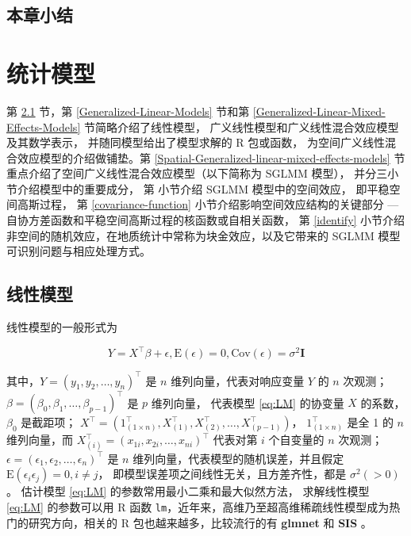 \documentclass[12pt,a4paper,UTF8,twoside]{book}
\theoremstyle{definition}
\theoremstyle{definition}
\theoremstyle{definition}
\theoremstyle{remark}
\begin{document}
\hypertarget{sec:foundations}{%
\section{本章小结}\label{sec:foundations}}

\hypertarget{models}{%
\chapter{统计模型}\label{models}}

第 \ref{Linear-Models} 节，第 \ref{Generalized-Linear-Models} 节和第
\ref{Generalized-Linear-Mixed-Effects-Models} 节简略介绍了线性模型，
广义线性模型和广义线性混合效应模型及其数学表示，
并随同模型给出了模型求解的 R 包或函数，
为空间广义线性混合效应模型的介绍做铺垫。第
\ref{Spatial-Generalized-linear-mixed-effects-models}
节重点介绍了空间广义线性混合效应模型（以下简称为 SGLMM 模型），
并分三小节介绍模型中的重要成分， 第 小节介绍 SGLMM 模型中的空间效应，
即平稳空间高斯过程， 第 \ref{covariance-function}
小节介绍影响空间效应结构的关键部分 ---
自协方差函数和平稳空间高斯过程的核函数或自相关函数， 第 \ref{identify}
小节介绍非空间的随机效应，在地质统计中常称为块金效应，以及它带来的 SGLMM
模型可识别问题与相应处理方式。

\hypertarget{Linear-Models}{%
\section{线性模型}\label{Linear-Models}}

线性模型的一般形式为

\begin{equation}
Y = X^{\top}\beta + \epsilon, \mathrm{E}(\epsilon) = 0, \mathrm{Cov}(\epsilon) = \sigma^2\mathbf{I}  \label{eq:LM}
\end{equation}

\noindent 其中，\(Y = (y_1,y_2,\ldots,y_n)^{\top}\) 是 \(n\)
维列向量，代表对响应变量 \(Y\) 的 \(n\) 次观测；
\(\beta = (\beta_0,\beta_1,\ldots,\beta_{p-1})^{\top}\) 是 \(p\)
维列向量， 代表模型 \eqref{eq:LM} 的协变量 \(X\) 的系数，\(\beta_0\)
是截距项；
\(X^{\top} = (1_{(1\times n)}^{\top},X_{(1)}^{\top},X_{(2)}^{\top},\ldots,X_{(p-1)}^{\top})\)，
\(1_{(1\times n)}^{\top}\) 是全 1 的 \(n\) 维列向量，而
\(X_{(i)}^{\top} = (x_{1i},x_{2i},\ldots,x_{ni})^{\top}\) 代表对第 \(i\)
个自变量的 \(n\) 次观测；
\(\epsilon = (\epsilon_1,\epsilon_2,\ldots,\epsilon_n)^{\top}\) 是 \(n\)
维列向量，代表模型的随机误差，并且假定
\(\mathrm{E}(\epsilon_i \epsilon_j) = 0, i \ne j\)，
即模型误差项之间线性无关，且方差齐性，都是 \(\sigma^2(>0)\)。 估计模型
\eqref{eq:LM} 的参数常用最小二乘和最大似然方法， 求解线性模型 \eqref{eq:LM}
的参数可以用 R 函数
\texttt{lm}，近年来，高维乃至超高维稀疏线性模型成为热门的研究方向，相关的
R 包也越来越多，比较流行的有 \textbf{glmnet} \citep{glmnet2011JSS} 和
\textbf{SIS} \citep{SIS2016JSS}。
\end{document}
